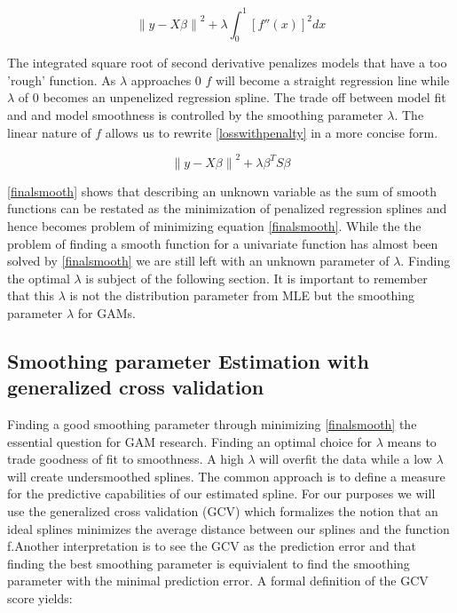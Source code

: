 \documentclass{article}
\begin{document}
    \begin{equation} \label{losswithpenalty} \left \| y - X\beta  \right \|^2 + \lambda \int_{0}^{1} [{f}''(x)]^2 dx \end{equation}

    The integrated square root of second derivative penalizes models that have a too 'rough' function. As $\lambda$ approaches 0 $f$ will become a straight regression line while $\lambda$ of 0 becomes an unpenelized regression spline. The trade off between model fit and and model smoothness is controlled by the smoothing parameter $\lambda$. The linear nature of $f$ allows us to rewrite \ref{losswithpenalty} in a more concise form.

    \begin{equation} \label{finalsmooth} \left \| y - X\beta  \right \|^2 + \lambda \beta^T S\beta  \end{equation}

    \ref{finalsmooth} shows that describing an unknown variable as the sum of smooth functions can be restated as the minimization of penalized regression splines and hence becomes problem of minimizing equation \ref{finalsmooth}. While the the problem of finding a smooth function for a univariate function has almost been solved by \ref{finalsmooth} we are still left with an unknown parameter of $\lambda$. Finding the optimal $\lambda$ is subject of the following section. It is important to remember that this $\lambda$ is not the distribution parameter from MLE but the smoothing parameter $\lambda$ for GAMs.

    \subsection{Smoothing parameter Estimation with generalized cross validation}
    Finding a good smoothing parameter through minimizing \ref{finalsmooth} the essential question for GAM research. Finding an optimal choice for $\lambda$ means to trade goodness of fit to smoothness. A high $\lambda$ will overfit the data while a low $\lambda$ will create undersmoothed splines. The common approach is to define a measure for the predictive capabilities of our estimated spline. For our purposes we will use the generalized cross validation (GCV) which formalizes the notion that an ideal splines minimizes the average distance between our splines and the function f.Another interpretation is to see the GCV as the prediction error and that finding the best smoothing parameter is equivialent to find the smoothing parameter with the minimal prediction error. A formal definition of the GCV score yields:
\end{document}
